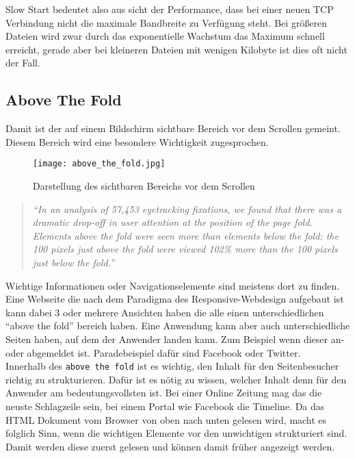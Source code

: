 		Slow Start bedeutet also aus sicht der Performance, dass bei einer neuen TCP Verbindung nicht die maximale Bandbreite zu Verfügung steht. Bei größeren Dateien wird zwar durch das exponentielle Wachstum das Maximum schnell erreicht, gerade aber bei kleineren Dateien mit wenigen Kilobyte ist dies oft nicht der Fall.


	\subsection{Above The Fold} %
	\label{sub:above_the_fold}
		Damit ist der auf einem Bildschirm sichtbare Bereich vor dem Scrollen gemeint. Diesem Bereich wird eine besondere Wichtigkeit zugesprochen.
		\begin{figure}[htbp]
			\begin{center}
				\texttt{[image: above\_the\_fold.jpg]}
				\caption{Darstellung des sichtbaren Bereichs vor dem Scrollen}
				\label{fig:above_the_fold}
			\end{center}
		\end{figure}

		\begin{quote}
			 \textit{"`In an analysis of 57,453 eyetracking fixations, we found that there was a dramatic drop-off in user attention at the position of the page fold. Elements above the fold were seen more than elements below the fold: the 100 pixels just above the fold were viewed 102\% more than the 100 pixels just below the fold."'} \autocite{nng15}
		\end{quote}

		Wichtige Informationen oder Navigationselemente sind meistens dort zu finden. Eine Webseite die nach dem Paradigma des Responsive-Webdesign aufgebaut ist kann dabei 3 oder mehrere Ansichten haben die alle einen unterschiedlichen "`above the fold"' bereich haben. Eine Anwendung kann aber auch unterschiedliche Seiten haben, auf dem der Anwender landen kann. Zum Beispiel wenn dieser an- oder abgemeldet ist. Paradebeispiel dafür sind Facebook oder Twitter.\\

		Innerhalb des \texttt{above the fold} ist es wichtig, den Inhalt für den Seitenbesucher richtig zu strukturieren. Dafür ist es nötig zu wissen, welcher Inhalt denn für den Anwender am bedeutungsvollsten ist. Bei einer Online Zeitung mag das die neuste Schlagzeile sein, bei einem Portal wie Facebook die Timeline. Da das HTML Dokument vom Browser von oben nach unten gelesen wird, macht es folglich Sinn, wenn die wichtigen Elemente vor den unwichtigen strukturiert sind. Damit werden diese zuerst gelesen und können damit früher angezeigt werden.

